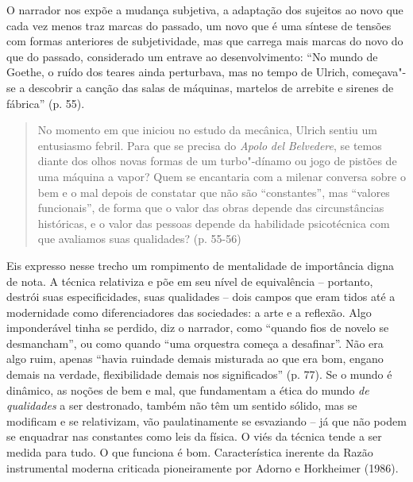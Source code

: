 O narrador nos expõe a mudança subjetiva, a adaptação dos sujeitos ao
novo que cada vez menos traz marcas do passado, um novo que é uma
síntese de tensões com formas anteriores de subjetividade, mas que
carrega mais marcas do novo do que do passado, considerado um entrave ao
desenvolvimento: ``No mundo de Goethe, o ruído dos teares ainda
perturbava, mas no tempo de Ulrich, começava"-se a descobrir a canção das
salas de máquinas, martelos de arrebite e sirenes de fábrica'' (p. 55).

\begin{quote}
No momento em que iniciou no estudo da mecânica, Ulrich sentiu um
entusiasmo febril. Para que se precisa do \emph{Apolo} \emph{del}
\emph{Belvedere}, se temos diante dos olhos novas formas de um
turbo"-dínamo ou jogo de pistões de uma máquina a vapor? Quem se
encantaria com a milenar conversa sobre o bem e o mal depois de
constatar que não são ``constantes'', mas ``valores funcionais'', de
forma que o valor das obras depende das circunstâncias históricas, e o
valor das pessoas depende da habilidade psicotécnica com que avaliamos
suas qualidades? (p. 55-56)
\end{quote}

Eis expresso nesse trecho um rompimento de mentalidade de importância
digna de nota. A técnica relativiza e põe em seu nível de equivalência
-- portanto, destrói suas especificidades, suas qualidades -- dois
campos que eram tidos até a modernidade como diferenciadores das
sociedades: a arte e a reflexão. Algo imponderável tinha se perdido, diz
o narrador, como ``quando fios de novelo se desmancham'', ou como quando
``uma orquestra começa a desafinar''. Não era algo ruim, apenas ``havia
ruindade demais misturada ao que era bom, engano demais na verdade,
flexibilidade demais nos significados'' (p. 77). Se o mundo é dinâmico,
as noções de bem e mal, que fundamentam a ética do mundo \emph{de
qualidades} a ser destronado, também não têm um sentido sólido, mas se
modificam e se relativizam, vão paulatinamente se esvaziando -- já que
não podem se enquadrar nas constantes como leis da física. O viés da
técnica tende a ser medida para tudo. O que funciona é bom.
Característica inerente da Razão instrumental moderna criticada
pioneiramente por Adorno e Horkheimer (1986).

